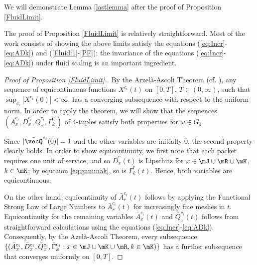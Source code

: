 \documentclass{amsart}
\begin{document}
We will demonstrate Lemma \ref{lastlemma} after the proof of Proposition \ref{FluidLimit}. 

The proof of Proposition \ref{FluidLimit} is relatively straightforward. Most of the work consists
of showing the above limits satisfy the equations (\ref{eq:Incr}-\ref{eq:ADk}) and (\ref{Fluid:1}-\ref{PF}); the invariance of
 the equations (\ref{eq:Incr}-\ref{eq:ADk}) under fluid scaling is an important ingredient. 

\begin{proof}[Proof of Proposition \ref{FluidLimit}.]

By the Arzel\`a-Ascoli Theorem (cf. \cite{Bi99}), any sequence of equicontinuous functions $X^{c_i} (t)$ on $[0,T]$, $T\in (0, \infty)$, such that $\sup_{c_i} |X^{c_i} (0)| < \infty$, has a converging subsequence with respect to the uniform norm.  In order to apply the theorem, we will show that the sequences
$ (\bar{A}^{c_i}_x, \bar{D}^{c_i}_x,\bar{Q}^{c_i}_x,\bar{\Gamma}_k^{c_i})$ of $4$-tuples
satisfy both properties for $\omega \in G_1$.
\iffalse
\begin{equation}\label{ModConv}
\lim_{\delta \rightarrow \infty} \sup_{X\in S} w_X(\delta) = 0,
\end{equation}
where $w_X(\delta)$ is the modulus of continuity 
\begin{equation*}
w_X(\delta) = \sup_{\substack{0\leq s,t \leq T:\\ |t-s|< \delta }} \left| X(t) - X(s) \right|.
\end{equation*}
\fi

Since $|\bar{\vecQ}^{c_i}(0)|=1$ and the other variables are initially $0$, the second property
clearly holds.  In order to show equicontinuity, we first note that each packet requires one unit of service, and so $\bar{D}^c_x(t)$ is Lipschitz for $x\in\mJ\cup \mR \cup \mK$, $k\in\mK$; by
equation \eqref{eq:gammak}, so is $\bar{\Gamma}^c_k(t)$.
Hence, both variables are equicontinuous. 

On the other hand, equicontinuity of $\bar{A}^{c_i}_r (t)$ follows by applying 
the Functional Strong Law of Large Numbers to $\bar{A}^{c_i}_r(t)$ for increasingly fine meshes in $t$. Equicontinuity for the remaining variables $\bar{A}^{c_i}_x (t)$ and $\bar{Q}^{c_i}_x (t)$ follows from straightforward calculations using the equations (\ref{eq:Incr}-\ref{eq:ADk}). Consequently, by the Azel\`a-Ascoli Theorem, every subsequence $\{ (\bar{A}^{c_i}_x, \bar{D}^{c_i}_x,\bar{Q}^{c_i}_x,\bar{\Gamma}_k^{c_i} : x\in \mJ \cup\mK \cup \mR, k\in\mK) \}$ has a further subsequence that converges uniformly on $[0,T]$.


\end{proof}
\end{document}

